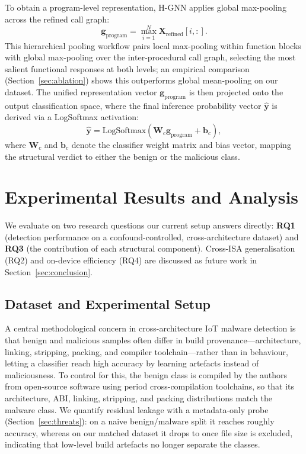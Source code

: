 \documentclass[conference]{IEEEtran}
\begin{document}
To obtain a program-level representation, H-GNN applies global max-pooling across the refined call graph:
\begin{equation}
\mathbf{g}_{\text{program}} = \operatorname*{max}_{i=1}^{N} \mathbf{X}_{\text{refined}}[i, :].
\end{equation}
This hierarchical pooling workflow pairs local max-pooling within function blocks with global max-pooling over the inter-procedural call graph, selecting the most salient functional responses at both levels; an empirical comparison (Section~\ref{sec:ablation}) shows this outperforms global mean-pooling on our dataset. The unified representation vector $\mathbf{g}_{\text{program}}$ is then projected onto the output classification space, where the final inference probability vector $\hat{\mathbf{y}}$ is derived via a LogSoftmax activation:
\begin{equation}
\hat{\mathbf{y}} = \mathrm{LogSoftmax}\left(\mathbf{W}_{c} \mathbf{g}_{\text{program}} + \mathbf{b}_{c}\right),
\end{equation}
where $\mathbf{W}_{c}$ and $\mathbf{b}_{c}$ denote the classifier weight matrix and bias vector, mapping the structural verdict to either the benign or the malicious class.

\section{Experimental Results and Analysis}
\label{sec:experiments}

We evaluate  on two research questions our current setup
answers directly: \textbf{RQ1} (detection performance on a
confound-controlled, cross-architecture dataset) and \textbf{RQ3} (the
contribution of each structural component). Cross-ISA generalisation
(RQ2) and on-device efficiency (RQ4) are discussed as future work in
Section~\ref{sec:conclusion}.

\subsection{Dataset and Experimental Setup}
\label{sec:setup}

A central methodological concern in cross-architecture IoT malware
detection is that benign and malicious samples often differ in build
provenance---architecture, linking, stripping, packing, and compiler
toolchain---rather than in behaviour, letting a classifier reach high
accuracy by learning artefacts instead of maliciousness. To control for
this, the benign class is compiled by the authors from open-source
software using period cross-compilation toolchains, so that its
architecture, ABI, linking, stripping, and packing distributions match
the malware class. We quantify residual leakage with a metadata-only
probe (Section~\ref{sec:threats}): on a naive benign/malware split it
reaches roughly \probeOld{} accuracy, whereas on our matched dataset it
drops to \probeNew{} once file size is excluded, indicating that low-level
build artefacts no longer separate the classes.
\end{document}
